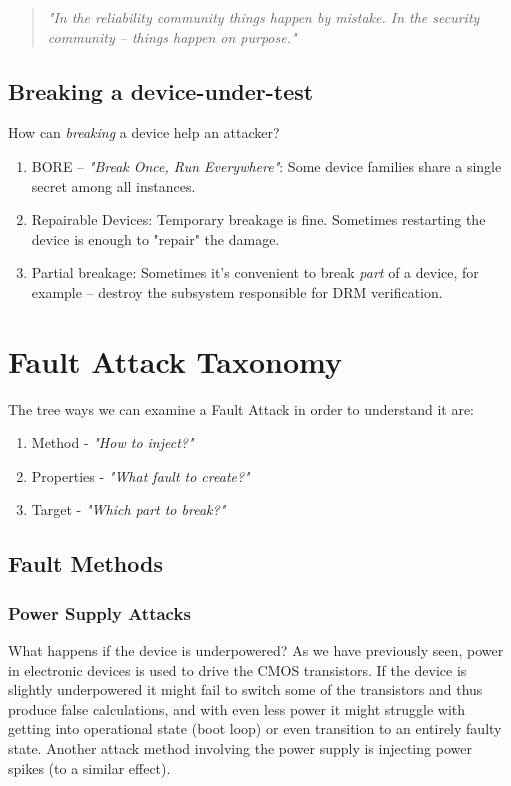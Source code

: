 \begin{quote}
	\textit{"In the reliability community things happen by mistake. In the security community -- things happen on purpose."}
\end{quote}

\subsection*{Breaking a device-under-test} \label{subsec:breaking_a_device_under_test}
How can \emph{breaking} a device help an attacker?

\begin{enumerate}
	\item BORE -- \textit{"Break Once, Run Everywhere"}: Some device families share a single secret among all instances.
	\item Repairable Devices: Temporary breakage is fine. Sometimes restarting the device is enough to "repair" the damage.
	\item Partial breakage: Sometimes it's convenient to break \emph{part} of a device, for example -- destroy the subsystem responsible for DRM verification.
\end{enumerate}

\section{Fault Attack Taxonomy} \label{sec:fault_attack_taxonomy}
The tree ways we can examine a Fault Attack in order to understand it are:
\begin{enumerate}
	\item Method - \emph{"How to inject?"}
	\item Properties - \emph{"What fault to create?"}
	\item Target - \emph{"Which part to break?"}
\end{enumerate}

\subsection{Fault Methods} \label{subsec:fault_methods}

\subsubsection{Power Supply Attacks} \label{subsubsec:power_supply_attacks}
What happens if the device is underpowered?
As we have previously seen, power in electronic devices is used to drive the CMOS transistors. If the device is slightly underpowered it might fail to switch some of the transistors and thus produce false calculations, and with even less power it might  struggle with getting into operational state (boot loop) or even transition to an entirely faulty state.
Another attack method involving the power supply is injecting power spikes (to a similar effect).

